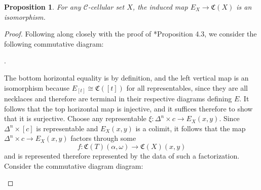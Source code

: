 \documentclass{amsart}
\numberwithin{equation}{section}
\theoremstyle{plain}   %
\newtheorem{prop}[subsection]{Proposition}
\theoremstyle{remark}
\theoremstyle{plain}
\DeclareMathOperator*{\coliml}{colim}
\newcommand{\overcat}[2]{{\left(#1\downarrow #2\right)}}
\newcommand{\C}{\ensuremath{\mathcal{C}}}
\begin{document}
\begin{prop} For any \(\C\)-cellular set \(X\), the induced map \(E_X\to \mathfrak{C}(X)\) is an isomorphism.
\end{prop}
\begin{proof} Following along closely with the proof of \cite{ds1}*{Proposition 4.3}, we consider the following commutative diagram:
	\begin{center}
		.
	\end{center}
	The bottom horizontal equality is by definition, and the left vertical map is an isomorphism because \(E_{[t]}\cong \mathfrak{C}([t])\) for all representables, since they are all necklaces and therefore are terminal in their respective diagrams defining \(E\). It follows that the top horizontal map is injective, and it suffices therefore to show that it is surjective. Choose any representable \(\xi:\Delta^n \times c \to E_X(x,y)\). Since \(\Delta^n\times [c]\) is representable and \(E_X(x,y)\) is a colimit, it follows that the map \(\Delta^n\times c\to E_X(x,y)\) factors through some \[f:\mathfrak{C}(T)(\alpha,\omega) \to \mathfrak{C}(X)(x,y)\] and is represented therefore represented by the data of such a factorization.   Consider the commutative diagram diagram:
	\begin{center}
\end{center}
\end{proof}
\end{document}
